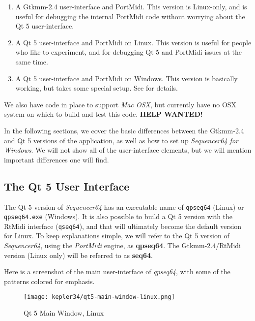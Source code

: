    \begin{enumerate}
      \item A Gtkmm-2.4 user-interface and PortMidi.  This version is
         Linux-only, and is useful for debugging the internal PortMidi code
         without worrying about the Qt 5 user-interface.
      \item A Qt 5 user-interface and PortMidi on Linux.  This version is
         useful for people who like to experiment, and for debugging Qt 5 and
         PortMidi issues at the same time.
      \item A Qt 5 user-interface and PortMidi on Windows.  This version is
         basically working, but takes some special setup.
         See  for details.
   \end{enumerate}

   We also have code in place to support
   \textsl{Mac OSX},
   but currently have no OSX system on which to build and test this
   code.  \textbf{HELP WANTED!}

   In the following sections, we cover the basic differences between the
   Gtkmm-2.4 and Qt 5 versions of the application, as well as how to set up
   \textsl{Sequencer64 for Windows}.
   We will not show all of the user-interface elements, but we will mention
   important differences one will find.

\subsection{The Qt 5 User Interface}
\label{subsec:qt_portmidi_qt5_user_interface}

   The Qt 5 version of \textsl{Sequencer64} has an executable name of
   \texttt{qpseq64} (Linux) or \texttt{qpseq64.exe} (Windows).
   It is also possible to build a Qt 5 version with the RtMidi interface
   (\texttt{qseq64}), and
   that will ultimately become the default version for Linux.
   To keep explanations simple, we will refer to the Qt 5 version of
   \textsl{Sequencer64}, using the \textsl{PortMidi} engine,
   as \textbf{qpseq64}.
   The Gtkmm-2.4/RtMidi version (Linux only) will be referred to as
   \textbf{seq64}.

   Here is a screenshot of the main user-interface of \textsl{qpseq64}, with
   some of the patterns colored for emphasis.

\begin{figure}[H]
   \centering 
   \texttt{[image: kepler34/qt5-main-window-linux.png]}
   \caption{Qt 5 Main Window, Linux}
   \label{fig:qt5_main_window_linux}
\end{figure}

